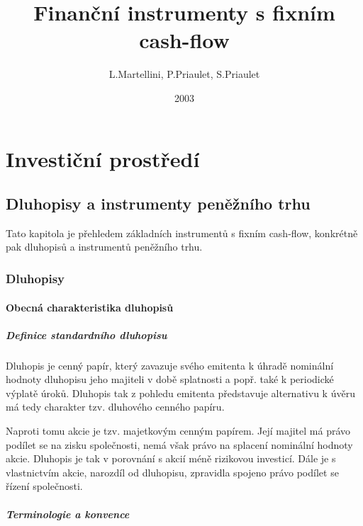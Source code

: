 \documentclass[a4paper]{book}
\begin{document}
\title{Finanční instrumenty s fixním cash-flow}
\author{L.Martellini, P.Priaulet, S.Priaulet}
\date{2003}
\maketitle

\tableofcontents

\part{Investiční prostředí}

\chapter{Dluhopisy a instrumenty peněžního trhu}

Tato kapitola je přehledem základních instrumentů s fixním cash-flow, konkrétně pak dluhopisů a instrumentů peněžního trhu.

\section{Dluhopisy}

\subsection{Obecná charakteristika dluhopisů}

\subsubsection{Definice standardního dluhopisu}

Dluhopis je cenný papír, který zavazuje svého emitenta k úhradě nominální hodnoty dluhopisu jeho majiteli v době splatnosti a popř. také k periodické výplatě úroků. Dluhopis tak z pohledu emitenta představuje alternativu k úvěru má tedy charakter tzv. dluhového cenného papíru.

Naproti tomu akcie je tzv. majetkovým cenným papírem. Její majitel má právo podílet se na zisku společnosti, nemá však právo na splacení nominální hodnoty akcie. Dluhopis je tak v porovnání s akcií méně rizikovou investicí. Dále je s vlastnictvím akcie, narozdíl od dluhopisu, zpravidla spojeno právo podílet se řízení společnosti.

\subsubsection{Terminologie a konvence}
\end{document}
